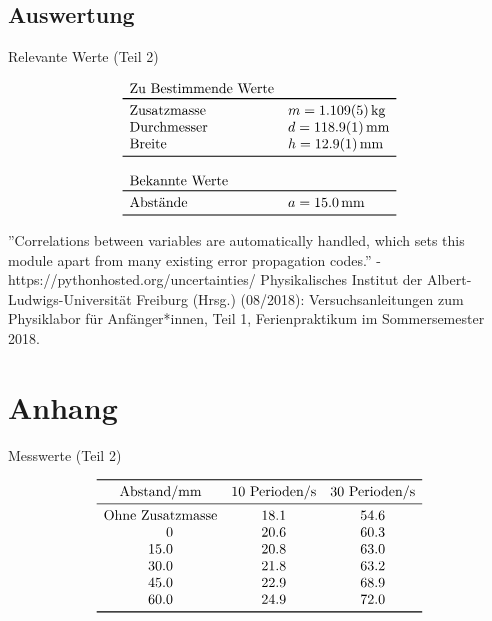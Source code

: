 \documentclass[11pt,a4paper]{article}
\begin{document}
\subsection{Auswertung}

\begin{table}[ht]
\caption{Relevante Werte (Teil 2)}
$$
\begin{array}{ll}
	\multicolumn{1}{l}{\textrm{Zu Bestimmende Werte}} \\
	\toprule 
	\textrm{Zusatzmasse} & m = 1.109(5)\,\textrm{kg} \\
	\textrm{Durchmesser} & d = 118.9(1)\,\textrm{mm} \\
	\textrm{Breite} & h = 12.9(1)\,\textrm{mm} \\
	\bottomrule \\
	\multicolumn{2}{l}{\textrm{Bekannte Werte}} \\
	\toprule
	\textrm{Abstände} & a = 15.0\,\textrm{mm}\\
	\bottomrule 
\end{array}
$$
\end{table}




\vfill

\begin{thebibliography}{9}
 ''Correlations between variables are automatically handled, which sets this module apart from many existing error propagation codes.'' - https://pythonhosted.org/uncertainties/
  Physikalisches Institut der Albert-Ludwigs-Universität Freiburg (Hrsg.) (08/2018): Versuchsanleitungen zum Physiklabor für Anfänger*innen, Teil 1, Ferienpraktikum im Sommersemester 2018.
 \end{thebibliography}
 

\pagebreak


\section{Anhang}

\begin{table}[h]
\caption{Messwerte (Teil 2)}
$$
\begin{array}{ccc}	
	\toprule 
	\textrm{Abstand/mm} & \textrm{10 Perioden/s} & \textrm{30 Perioden/s}\\
	\midrule
	\multicolumn{1}{l}{\textrm{Ohne Zusatzmasse}} & 18.1 & 54.6\\
	\phantom{zz.}0 & 20.6 & 60.3\\
	15.0 & 20.8 & 63.0\\
	30.0 & 21.8 & 63.2\\
	45.0 & 22.9 & 68.9\\
	60.0 & 24.9 & 72.0\\
	\bottomrule 
\end{array}
$$
\end{table}
\end{document}
